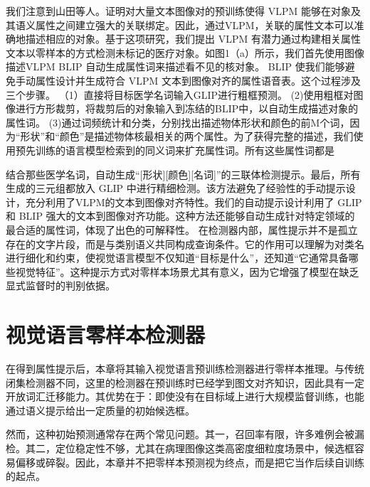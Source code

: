 我们注意到山田等人。证明对大量文本图像对的预训练使得 VLPM 能够在对象及其语义属性之间建立强大的关联绑定\cite{yamada2022lemons}。因此，通过VLPM，关联的属性文本可以准确地描述相应的对象。基于这项研究，我们提出 VLPM 有潜力通过构建相关属性文本以零样本的方式检测未标记的医疗对象。如图1（a）所示，我们首先使用图像描述VLPM BLIP \cite{li2022blip}自动生成属性词来描述看不见的核对象。 BLIP 使我们能够避免手动属性设计并生成符合 VLPM 文本到图像对齐的属性语音表。这个过程涉及三个步骤。 （1）直接将目标医学名词输入GLIP进行粗框预测。 (2)使用粗框对图像进行方形裁剪，将裁剪后的对象输入到冻结的BLIP中，以自动生成描述对象的属性词。 (3)通过词频统计和分类，分别找出描述物体形状和颜色的前M个词，因为“形状”和“颜色”是描述物体核最相关的两个属性。为了获得完整的描述，我们使用预先训练的语言模型检索到的同义词来扩充属性词\cite{radford2019language}。所有这些属性词都是

结合那些医学名词，自动生成“[形状][颜色][名词]”的三联体检测提示。最后，所有生成的三元组都放入 GLIP 中进行精细检测。该方法避免了经验性的手动提示设计，充分利用了VLPM的文本到图像对齐特性。我们的自动提示设计利用了 GLIP 和 BLIP 强大的文本到图像对齐功能。这种方法还能够自动生成针对特定领域的最合适的属性词，体现了出色的可解释性。
在检测器内部，属性提示并不是孤立存在的文字片段，而是与类别语义共同构成查询条件。它的作用可以理解为对类名进行细化和约束，使视觉语言模型不仅知道“目标是什么”，还知道“它通常具备哪些视觉特征”。这种提示方式对零样本场景尤其有意义，因为它增强了模型在缺乏显式监督时的判别依据。

\section{视觉语言零样本检测器}
在得到属性提示后，本章将其输入视觉语言预训练检测器进行零样本推理。与传统闭集检测器不同，这里的检测器在预训练时已经学到图文对齐知识，因此具有一定开放词汇迁移能力。其优势在于：即使没有在目标域上进行大规模监督训练，也能通过语义提示给出一定质量的初始候选框。

然而，这种初始预测通常存在两个常见问题。其一，召回率有限，许多难例会被漏检。其二，定位稳定性不够，尤其在病理图像这类高密度细粒度场景中，候选框容易偏移或碎裂。因此，本章并不把零样本预测视为终点，而是把它当作后续自训练的起点。

